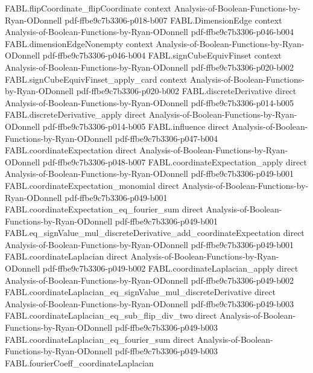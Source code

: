 \begin{theorem}
\proofstep
  {FABL.flipCoordinate_flipCoordinate}
  {context}
  {Analysis-of-Boolean-Functions-by-Ryan-ODonnell}
  {pdf-ffbe9c7b3306-p018-b007}
\proofstep
  {FABL.DimensionEdge}
  {context}
  {Analysis-of-Boolean-Functions-by-Ryan-ODonnell}
  {pdf-ffbe9c7b3306-p046-b004}
\proofstep
  {FABL.dimensionEdgeNonempty}
  {context}
  {Analysis-of-Boolean-Functions-by-Ryan-ODonnell}
  {pdf-ffbe9c7b3306-p046-b004}
\proofstep
  {FABL.signCubeEquivFinset}
  {context}
  {Analysis-of-Boolean-Functions-by-Ryan-ODonnell}
  {pdf-ffbe9c7b3306-p020-b002}
\proofstep
  {FABL.signCubeEquivFinset_apply_card}
  {context}
  {Analysis-of-Boolean-Functions-by-Ryan-ODonnell}
  {pdf-ffbe9c7b3306-p020-b002}
\proofstep
  {FABL.discreteDerivative}
  {direct}
  {Analysis-of-Boolean-Functions-by-Ryan-ODonnell}
  {pdf-ffbe9c7b3306-p014-b005}
\proofstep
  {FABL.discreteDerivative_apply}
  {direct}
  {Analysis-of-Boolean-Functions-by-Ryan-ODonnell}
  {pdf-ffbe9c7b3306-p014-b005}
\proofstep
  {FABL.influence}
  {direct}
  {Analysis-of-Boolean-Functions-by-Ryan-ODonnell}
  {pdf-ffbe9c7b3306-p047-b004}
\proofstep
  {FABL.coordinateExpectation}
  {direct}
  {Analysis-of-Boolean-Functions-by-Ryan-ODonnell}
  {pdf-ffbe9c7b3306-p048-b007}
\proofstep
  {FABL.coordinateExpectation_apply}
  {direct}
  {Analysis-of-Boolean-Functions-by-Ryan-ODonnell}
  {pdf-ffbe9c7b3306-p049-b001}
\proofstep
  {FABL.coordinateExpectation_monomial}
  {direct}
  {Analysis-of-Boolean-Functions-by-Ryan-ODonnell}
  {pdf-ffbe9c7b3306-p049-b001}
\proofstep
  {FABL.coordinateExpectation_eq_fourier_sum}
  {direct}
  {Analysis-of-Boolean-Functions-by-Ryan-ODonnell}
  {pdf-ffbe9c7b3306-p049-b001}
\proofstep
  {FABL.eq_signValue_mul_discreteDerivative_add_coordinateExpectation}
  {direct}
  {Analysis-of-Boolean-Functions-by-Ryan-ODonnell}
  {pdf-ffbe9c7b3306-p049-b001}
\proofstep
  {FABL.coordinateLaplacian}
  {direct}
  {Analysis-of-Boolean-Functions-by-Ryan-ODonnell}
  {pdf-ffbe9c7b3306-p049-b002}
\proofstep
  {FABL.coordinateLaplacian_apply}
  {direct}
  {Analysis-of-Boolean-Functions-by-Ryan-ODonnell}
  {pdf-ffbe9c7b3306-p049-b002}
\proofstep
  {FABL.coordinateLaplacian_eq_signValue_mul_discreteDerivative}
  {direct}
  {Analysis-of-Boolean-Functions-by-Ryan-ODonnell}
  {pdf-ffbe9c7b3306-p049-b003}
\proofstep
  {FABL.coordinateLaplacian_eq_sub_flip_div_two}
  {direct}
  {Analysis-of-Boolean-Functions-by-Ryan-ODonnell}
  {pdf-ffbe9c7b3306-p049-b003}
\proofstep
  {FABL.coordinateLaplacian_eq_fourier_sum}
  {direct}
  {Analysis-of-Boolean-Functions-by-Ryan-ODonnell}
  {pdf-ffbe9c7b3306-p049-b003}
\proofstep
  {FABL.fourierCoeff_coordinateLaplacian}

\end{theorem}
